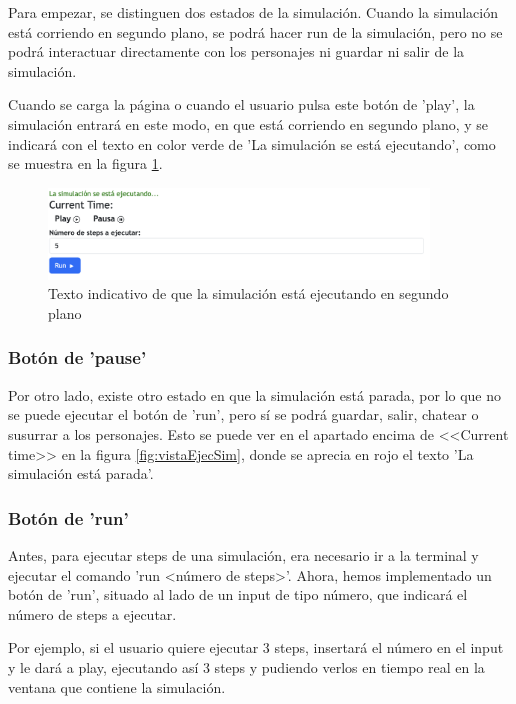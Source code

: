 Para empezar, se distinguen dos estados de la simulación. Cuando la simulación está corriendo en segundo plano, se podrá hacer run de la simulación, pero no se podrá interactuar directamente con los personajes ni guardar ni salir de la simulación.

Cuando se carga la página o cuando el usuario pulsa este botón de 'play', la simulación entrará en este modo, en que está corriendo en segundo plano, y se indicará con el texto en color verde de 'La simulación se está ejecutando', como se muestra en la figura \ref{fig:simuEjecutando}.

\begin{figure}[H]
	\centering
	\includegraphics[width = 0.9\textwidth]{Imagenes/Vectorial/simEjecutando.png}
	\caption{Texto indicativo de que la simulación está ejecutando en segundo plano}
	\label{fig:simuEjecutando}
\end{figure}

\subsubsection{Botón de 'pause'}

Por otro lado, existe otro estado en que la simulación está parada, por lo que no se puede ejecutar el botón de 'run', pero sí se podrá guardar, salir, chatear o susurrar a los personajes. Esto se puede ver en el apartado encima de <<Current time>> en la figura \ref{fig:vistaEjecSim}, donde se aprecia en rojo el texto 'La simulación está parada'.

\subsubsection{Botón de 'run'}

Antes, para ejecutar steps de una simulación, era necesario ir a la terminal y ejecutar el comando 'run <número de steps>'. Ahora, hemos implementado un botón de 'run', situado al lado de un input de tipo número, que indicará el número de steps a ejecutar. 

Por ejemplo, si el usuario quiere ejecutar 3 steps, insertará el número en el input y le dará a play, ejecutando así 3 steps y pudiendo verlos en tiempo real en la ventana que contiene la simulación.


